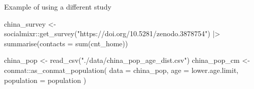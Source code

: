 \documentclass[
  14pt,
  ignorenonframetext,
  aspectratio=169,
]{beamer}
\newenvironment{Shaded}{\begin{snugshade}}{\end{snugshade}}
\newcommand{\AttributeTok}[1]{\textcolor[rgb]{0.40,0.45,0.13}{#1}}
\newcommand{\FunctionTok}[1]{\textcolor[rgb]{0.28,0.35,0.67}{#1}}
\newcommand{\NormalTok}[1]{\textcolor[rgb]{0.00,0.23,0.31}{#1}}
\newcommand{\OtherTok}[1]{\textcolor[rgb]{0.00,0.23,0.31}{#1}}
\newcommand{\SpecialCharTok}[1]{\textcolor[rgb]{0.37,0.37,0.37}{#1}}
\newcommand{\StringTok}[1]{\textcolor[rgb]{0.13,0.47,0.30}{#1}}
\begin{document}
\begin{frame}[fragile]{Example of using a different study}
\label{example-of-using-a-different-study}
\begin{Shaded}
\begin{Highlighting}[]
\NormalTok{china\_survey }\OtherTok{\textless{}{-}}\NormalTok{ socialmixr}\SpecialCharTok{::}\FunctionTok{get\_survey}\NormalTok{(}\StringTok{"https://doi.org/10.5281/zenodo.3878754"}\NormalTok{) }\SpecialCharTok{|\textgreater{}}
    \FunctionTok{summarise}\NormalTok{(}\AttributeTok{contacts =} \FunctionTok{sum}\NormalTok{(cnt\_home))}

\NormalTok{china\_pop }\OtherTok{\textless{}{-}} \FunctionTok{read\_csv}\NormalTok{(}\StringTok{"./data/china\_pop\_age\_dist.csv"}\NormalTok{)}
\NormalTok{china\_pop\_cm }\OtherTok{\textless{}{-}}\NormalTok{ conmat}\SpecialCharTok{::}\FunctionTok{as\_conmat\_population}\NormalTok{(}
  \AttributeTok{data =}\NormalTok{ china\_pop,}
  \AttributeTok{age =}\NormalTok{ lower.age.limit,}
  \AttributeTok{population =}\NormalTok{ population}
\NormalTok{)}
\end{Highlighting}
\end{Shaded}
\end{frame}
\end{document}
